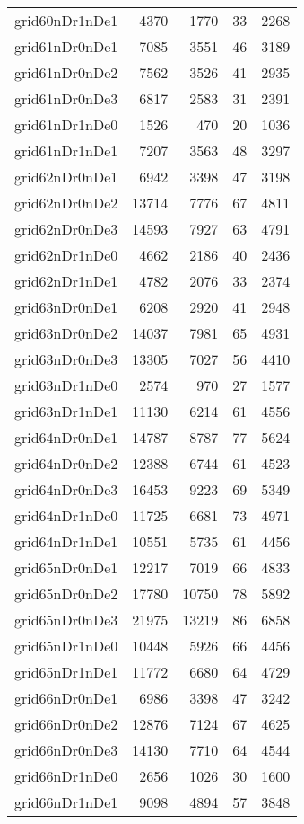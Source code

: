 \begin{longtable}{lrrrr}
grid60nDr1nDe1 & 4370 & 1770 & 33 & 2268 \\
grid61nDr0nDe1 & 7085 & 3551 & 46 & 3189 \\
grid61nDr0nDe2 & 7562 & 3526 & 41 & 2935 \\
grid61nDr0nDe3 & 6817 & 2583 & 31 & 2391 \\
grid61nDr1nDe0 & 1526 & 470 & 20 & 1036 \\
grid61nDr1nDe1 & 7207 & 3563 & 48 & 3297 \\
grid62nDr0nDe1 & 6942 & 3398 & 47 & 3198 \\
grid62nDr0nDe2 & 13714 & 7776 & 67 & 4811 \\
grid62nDr0nDe3 & 14593 & 7927 & 63 & 4791 \\
grid62nDr1nDe0 & 4662 & 2186 & 40 & 2436 \\
grid62nDr1nDe1 & 4782 & 2076 & 33 & 2374 \\
grid63nDr0nDe1 & 6208 & 2920 & 41 & 2948 \\
grid63nDr0nDe2 & 14037 & 7981 & 65 & 4931 \\
grid63nDr0nDe3 & 13305 & 7027 & 56 & 4410 \\
grid63nDr1nDe0 & 2574 & 970 & 27 & 1577 \\
grid63nDr1nDe1 & 11130 & 6214 & 61 & 4556 \\
grid64nDr0nDe1 & 14787 & 8787 & 77 & 5624 \\
grid64nDr0nDe2 & 12388 & 6744 & 61 & 4523 \\
grid64nDr0nDe3 & 16453 & 9223 & 69 & 5349 \\
grid64nDr1nDe0 & 11725 & 6681 & 73 & 4971 \\
grid64nDr1nDe1 & 10551 & 5735 & 61 & 4456 \\
grid65nDr0nDe1 & 12217 & 7019 & 66 & 4833 \\
grid65nDr0nDe2 & 17780 & 10750 & 78 & 5892 \\
grid65nDr0nDe3 & 21975 & 13219 & 86 & 6858 \\
grid65nDr1nDe0 & 10448 & 5926 & 66 & 4456 \\
grid65nDr1nDe1 & 11772 & 6680 & 64 & 4729 \\
grid66nDr0nDe1 & 6986 & 3398 & 47 & 3242 \\
grid66nDr0nDe2 & 12876 & 7124 & 67 & 4625 \\
grid66nDr0nDe3 & 14130 & 7710 & 64 & 4544 \\
grid66nDr1nDe0 & 2656 & 1026 & 30 & 1600 \\
grid66nDr1nDe1 & 9098 & 4894 & 57 & 3848 \\

\end{longtable}
